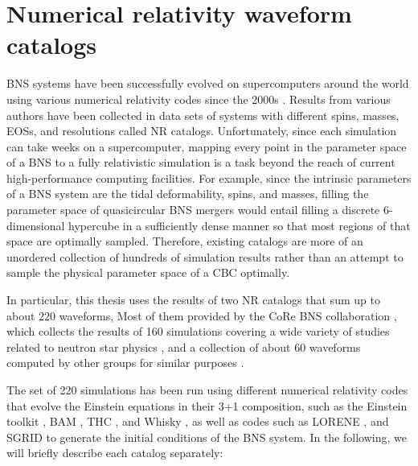 \newpage
\section{Numerical relativity waveform catalogs}\label{NR}

BNS systems have been successfully evolved on supercomputers around the world using various numerical relativity codes since the 2000s \cite{Shibata:1999hn,Shibata:1999wm,Shibata:2019wef}. Results from various authors have been collected in data sets of systems with different spins, masses, EOSs, and resolutions called NR catalogs. Unfortunately, since each simulation can take weeks on a supercomputer, mapping every point in the parameter space of a BNS to a fully relativistic simulation is a task beyond the reach of current high-performance computing facilities. For example, since the intrinsic parameters of a BNS system are the tidal deformability, spins, and masses, filling the parameter space of quasicircular BNS mergers would entail filling a discrete 6-dimensional hypercube in a sufficiently dense manner so that most regions of that space are optimally sampled. Therefore, existing catalogs are more of an unordered collection of hundreds of simulation results rather than an attempt to sample the physical parameter space of a CBC optimally. 


In particular, this thesis uses the results of two NR catalogs that sum up to about $220$ waveforms, Most of them provided by the CoRe BNS collaboration \cite{Dietrich:2018phi}, which collects the results of 160 simulations covering a wide variety of studies related to neutron star physics \cite{Bernuzzi:2014kca,Dietrich:2016hky,Bernuzzi:2016pie,Dietrich:2017aum, Dietrich:2016lyp,Dietrich:2015pxa,Dietrich:2017xqb,Radice:2017zta,Bernuzzi:2014owa,Dietrich:2015iva,Bernuzzi:2015rla, Radice:2016gym,Radice:2016rys,Radice:2017lry,Dietrich:2017feu, Zappa:2017xba}, and a collection of about 60 waveforms computed by other groups for similar purposes \cite{Maione:2016zqz, Kastaun:2016elu,Maione:2017aux,Ciolfi:2017uak,Feo:2016cbs, Kawamura:2016nmk,DePietri:2015lya,DePietri:2018tpx}.

The set of 220 simulations has been run using different numerical relativity codes that evolve the Einstein equations in their 3+1 composition, such as the Einstein toolkit \cite{Loffler:2011ay,Mosta:2013gwu}, BAM \cite{PhysRevLett.92.211101,PhysRevD.77.024027,Thierfelder:2011yi}, THC \cite{Radice_2012}, and Whisky \cite{Baiotti:2003btu,Giacomazzo:2007ti}, as well as codes such as LORENE \cite{lorene}, and SGRID \cite{Tichy_2009,Tichy_2012,Dietrich_2015} to generate the initial conditions of the BNS system. In the following, we will briefly describe each catalog separately:


